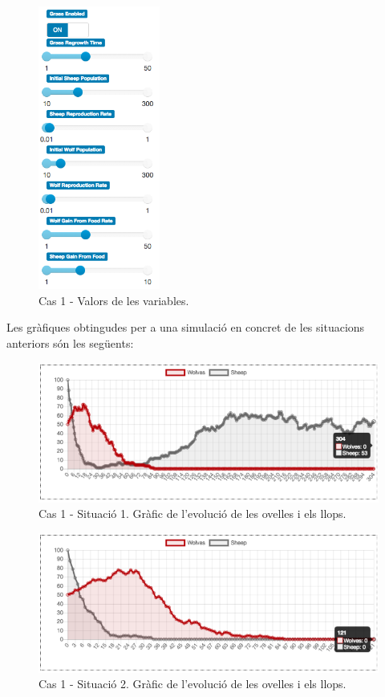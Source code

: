 \documentclass{article} %
\begin{document}
{	\begin{figure}[H]
		\includegraphics[width=4cm]{case_1_vars}
		\centering
		\color{blue}
		\caption{Cas 1 - Valors de les variables.}\label{visina8}
	\end{figure}

	Les gràfiques obtingudes per a una simulació en concret de les situacions anteriors són les següents:

	\begin{figure}[H]
		\begin{changemargin}{-1cm}{0.5cm}
			\includegraphics[width=14cm]{case_1_graph_sheeps}
			\centering
			\color{blue}
			\caption{Cas 1 - Situació 1. Gràfic de l'evolució de les ovelles i els llops.}\label{visina8}
		\end{changemargin}
	\end{figure}

	\begin{figure}[H]
		\begin{changemargin}{-1cm}{0.5cm}
			\includegraphics[width=14cm]{case_1_graph_grass}
			\centering
			\color{blue}
			\caption{Cas 1 - Situació 2. Gràfic de l'evolució de les ovelles i els llops.}\label{visina8}
		\end{changemargin}
	\end{figure}

}
\end{document}
